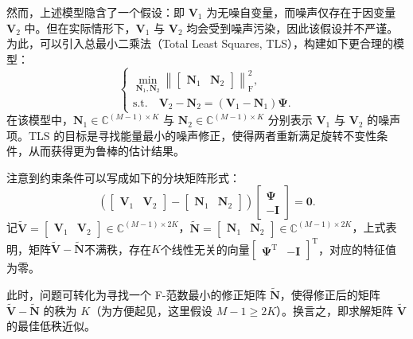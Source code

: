 然而，上述模型隐含了一个假设：即 \( \mathbf{V}_1 \) 为无噪自变量，而噪声仅存在于因变量 \( \mathbf{V}_2 \) 中。但在实际情形下，\( \mathbf{V}_1 \) 与 \( \mathbf{V}_2 \) 均会受到噪声污染，因此该假设并不严谨。为此，可以引入总最小二乘法（Total Least Squares, TLS），构建如下更合理的模型：
\[
    \begin{cases}
        \min\limits_{\mathbf{N}_1, \mathbf{N}_2}
        \left\|\begin{bmatrix}\mathbf{N}_1 & \mathbf{N}_2\end{bmatrix}\right\|_{\mathrm{F}}^2, \\[6pt]
        \text{s.t.} \quad \mathbf{V}_2 - \mathbf{N}_2 = (\mathbf{V}_1 - \mathbf{N}_1)\mathbf{\Psi}.
    \end{cases}
\]
在该模型中，\(\mathbf{N}_1 \in \mathbb{C}^{(M-1) \times K}\) 与 \(\mathbf{N}_2 \in \mathbb{C}^{(M-1) \times K}\) 分别表示 \( \mathbf{V}_1 \) 与 \( \mathbf{V}_2\) 的噪声项。TLS 的目标是寻找能量最小的噪声修正，使得两者重新满足旋转不变性条件，从而获得更为鲁棒的估计结果。

注意到约束条件可以写成如下的分块矩阵形式：
\[
    \left( \begin{bmatrix}
            \mathbf{V}_1 & \mathbf{V}_2
        \end{bmatrix} -
    \begin{bmatrix}
            \mathbf{N}_1 & \mathbf{N}_2
        \end{bmatrix} \right)
    \begin{bmatrix}
        \mathbf{\Psi} \\
        -\mathbf{I}
    \end{bmatrix} = \mathbf{0}.
\]
记\( \tilde{\mathbf{V}} = \begin{bmatrix} \mathbf{V}_1 & \mathbf{V}_2 \end{bmatrix} \in \mathbb{C}^{(M-1) \times 2K} \)，\( \tilde{\mathbf{N}} = \begin{bmatrix} \mathbf{N}_1 & \mathbf{N}_2 \end{bmatrix} \in \mathbb{C}^{(M-1) \times 2K} \)，上式表明，矩阵\( \tilde{\mathbf{V}} - \tilde{\mathbf{N}} \)不满秩，存在\( K \)个线性无关的向量\( \begin{bmatrix} \mathbf{\Psi}^{\mathrm{T}} & -\mathbf{I} \end{bmatrix}^{\mathrm{T}} \)，对应的特征值为零。

此时，问题可转化为寻找一个 F-范数最小的修正矩阵 \( \tilde{\mathbf{N}} \)，使得修正后的矩阵 \( \tilde{\mathbf{V}} - \tilde{\mathbf{N}} \) 的秩为 \( K \)（为方便起见，这里假设 \( M-1 \geq 2K \)）。换言之，即求解矩阵 \( \tilde{\mathbf{V}} \) 的最佳低秩近似。

